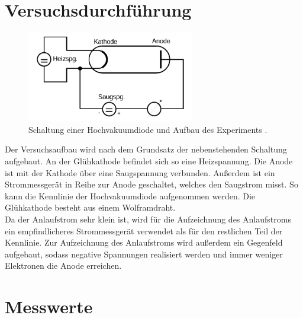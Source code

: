 


\section{Versuchsdurchführung}

\begin{figure}
    \vspace{-20pt}
    \begin{center}
        \includegraphics[width=0.65\textwidth]{Schaltung.png}
        \caption{Schaltung einer Hochvakuumdiode und Aufbau des Experiments \cite{Versuchsanleitung_v504}.}
    \end{center}
\end{figure}

Der Versuchsaufbau wird nach dem Grundsatz der nebenstehenden Schaltung aufgebaut. An der Glühkathode 
befindet sich so eine Heizspannung. Die Anode ist mit der Kathode über eine Saugspannung verbunden. 
Außerdem ist ein Strommessgerät in Reihe zur Anode geschaltet, welches den Saugstrom misst. So kann 
die Kennlinie der Hochvakuumdiode aufgenommen werden. Die Glühkathode besteht aus einem Wolframdraht. \\
\noindent Da der Anlaufstrom sehr klein ist, wird für die Aufzeichnung des Anlaufstroms ein empfindlicheres 
Strommessgerät verwendet als für den restlichen Teil der Kennlinie.
Zur Aufzeichnung des Anlaufstroms wird außerdem ein Gegenfeld aufgebaut, sodass negative Spannungen 
realisiert werden und immer weniger Elektronen die Anode erreichen. 


\section{Messwerte}

